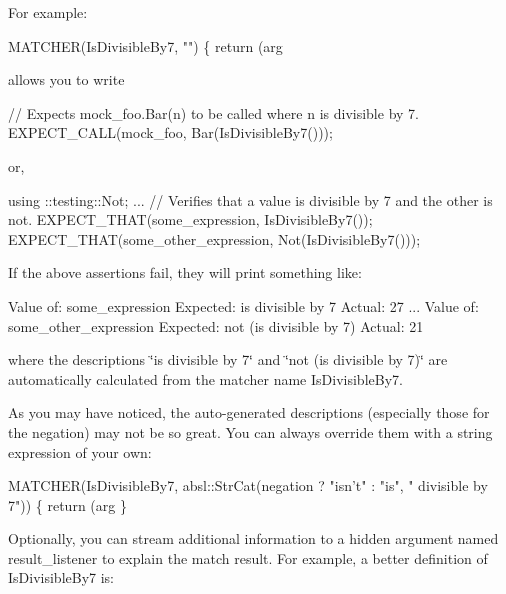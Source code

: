 For example\+:


\begin{DoxyCode}
MATCHER(IsDivisibleBy7, \textcolor{stringliteral}{""}) \{ \textcolor{keywordflow}{return} (arg %
\end{DoxyCode}


allows you to write


\begin{DoxyCode}
\textcolor{comment}{// Expects mock\_foo.Bar(n) to be called where n is divisible by 7.}
EXPECT\_CALL(mock\_foo, Bar(IsDivisibleBy7()));
\end{DoxyCode}


or,


\begin{DoxyCode}
using ::testing::Not;
...
\textcolor{comment}{// Verifies that a value is divisible by 7 and the other is not.}
EXPECT\_THAT(some\_expression, IsDivisibleBy7());
EXPECT\_THAT(some\_other\_expression, Not(IsDivisibleBy7()));
\end{DoxyCode}


If the above assertions fail, they will print something like\+:


\begin{DoxyCode}
Value of: some\_expression
Expected: is divisible by 7
  Actual: 27
...
Value of: some\_other\_expression
Expected: not (is divisible by 7)
  Actual: 21
\end{DoxyCode}


where the descriptions {\ttfamily \char`\"{}is divisible by 7\char`\"{}} and {\ttfamily \char`\"{}not (is divisible by 7)\char`\"{}} are automatically calculated from the matcher name {\ttfamily Is\+Divisible\+By7}.

As you may have noticed, the auto-\/generated descriptions (especially those for the negation) may not be so great. You can always override them with a {\ttfamily string} expression of your own\+:


\begin{DoxyCode}
MATCHER(IsDivisibleBy7,
        absl::StrCat(negation ? \textcolor{stringliteral}{"isn't"} : \textcolor{stringliteral}{"is"}, \textcolor{stringliteral}{" divisible by 7"})) \{
  \textcolor{keywordflow}{return} (arg %
\}
\end{DoxyCode}


Optionally, you can stream additional information to a hidden argument named {\ttfamily result\+\_\+listener} to explain the match result. For example, a better definition of {\ttfamily Is\+Divisible\+By7} is\+:


